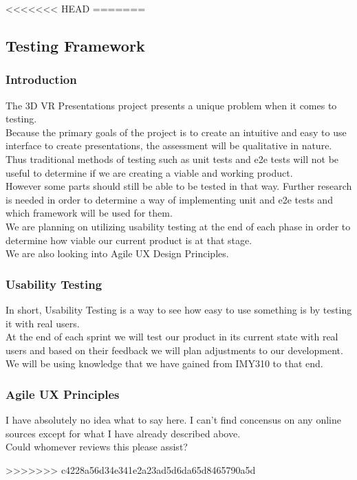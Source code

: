 \newpage
<<<<<<< HEAD
=======
\subsection{Testing Framework}
	\subsubsection{Introduction}
		The 3D VR Presentations project presents a unique problem when it comes to testing.\\
		Because the primary goals of the project is to create an intuitive and easy to use interface to create presentations,
		the assessment will be qualitative in nature.\\
		Thus traditional methods of testing such as unit tests and e2e tests will not be useful to determine if we are creating a viable and working product.\\
		However some parts should still be able to be tested in that way. Further research is needed in order to determine a way of implementing unit and e2e tests and which framework will be used for them.\\
		We are planning on utilizing usability testing at the end of each phase in order to determine how viable our current product is at that stage.\\
		We are also looking into Agile UX Design Principles.

	\subsubsection{Usability Testing}
		In short, Usability Testing is a way to see how easy to use something is by testing it with real users.\\
		At the end of each sprint we will test our product in its current state with real users and based on their feedback we will plan adjustments to our development.
		We will be using knowledge that we have gained from IMY310 to that end.

	\subsubsection{Agile UX Principles}
		I have absolutely no idea what to say here. I can't find concensus on any online sources except for what I have already described above.\\
		Could whomever reviews this please assist?

>>>>>>> c4228a56d34e341e2a23ad5d6da65d8465790a5d
